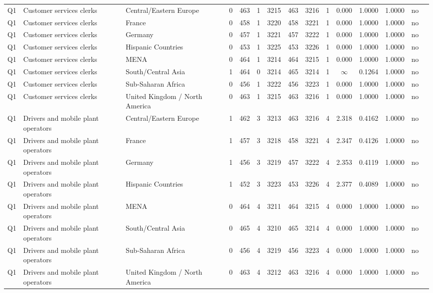 \begin{longtable}{lllrcccccccccll}
Q1 & Customer services clerks & Central/Eastern Europe & 0 & 463 & 1 & 3215 & 463 & 3216 & 1 & 0.000 & 1.0000 & 1.0000 & no \\
Q1 & Customer services clerks & France & 0 & 458 & 1 & 3220 & 458 & 3221 & 1 & 0.000 & 1.0000 & 1.0000 & no \\
Q1 & Customer services clerks & Germany & 0 & 457 & 1 & 3221 & 457 & 3222 & 1 & 0.000 & 1.0000 & 1.0000 & no \\
Q1 & Customer services clerks & Hispanic Countries & 0 & 453 & 1 & 3225 & 453 & 3226 & 1 & 0.000 & 1.0000 & 1.0000 & no \\
Q1 & Customer services clerks & MENA & 0 & 464 & 1 & 3214 & 464 & 3215 & 1 & 0.000 & 1.0000 & 1.0000 & no \\
Q1 & Customer services clerks & South/Central Asia & 1 & 464 & 0 & 3214 & 465 & 3214 & 1 & $\infty$ & 0.1264 & 1.0000 & no \\
Q1 & Customer services clerks & Sub-Saharan Africa & 0 & 456 & 1 & 3222 & 456 & 3223 & 1 & 0.000 & 1.0000 & 1.0000 & no \\
Q1 & Customer services clerks & United Kingdom / North America & 0 & 463 & 1 & 3215 & 463 & 3216 & 1 & 0.000 & 1.0000 & 1.0000 & no \\
Q1 & Drivers and mobile plant operators & Central/Eastern Europe & 1 & 462 & 3 & 3213 & 463 & 3216 & 4 & 2.318 & 0.4162 & 1.0000 & no \\
Q1 & Drivers and mobile plant operators & France & 1 & 457 & 3 & 3218 & 458 & 3221 & 4 & 2.347 & 0.4126 & 1.0000 & no \\
Q1 & Drivers and mobile plant operators & Germany & 1 & 456 & 3 & 3219 & 457 & 3222 & 4 & 2.353 & 0.4119 & 1.0000 & no \\
Q1 & Drivers and mobile plant operators & Hispanic Countries & 1 & 452 & 3 & 3223 & 453 & 3226 & 4 & 2.377 & 0.4089 & 1.0000 & no \\
Q1 & Drivers and mobile plant operators & MENA & 0 & 464 & 4 & 3211 & 464 & 3215 & 4 & 0.000 & 1.0000 & 1.0000 & no \\
Q1 & Drivers and mobile plant operators & South/Central Asia & 0 & 465 & 4 & 3210 & 465 & 3214 & 4 & 0.000 & 1.0000 & 1.0000 & no \\
Q1 & Drivers and mobile plant operators & Sub-Saharan Africa & 0 & 456 & 4 & 3219 & 456 & 3223 & 4 & 0.000 & 1.0000 & 1.0000 & no \\
Q1 & Drivers and mobile plant operators & United Kingdom / North America & 0 & 463 & 4 & 3212 & 463 & 3216 & 4 & 0.000 & 1.0000 & 1.0000 & no \\

\end{longtable}
